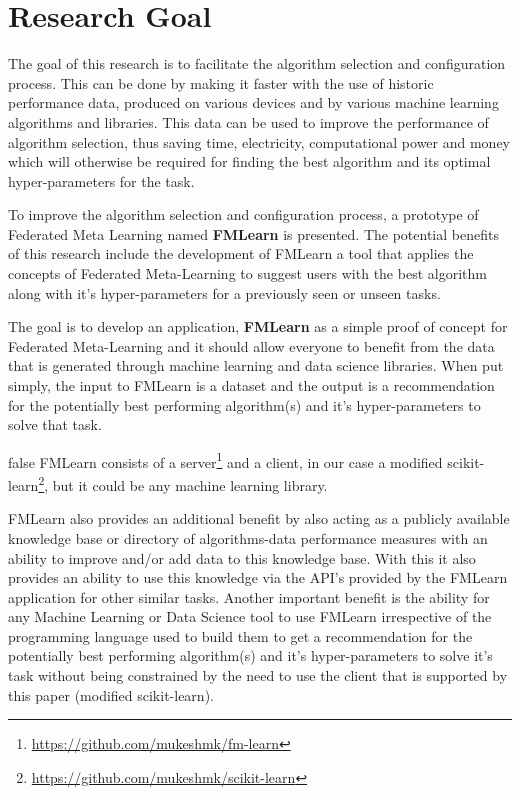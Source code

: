 \section{Research Goal}
The goal of this research is to facilitate the algorithm selection and configuration process. This can be done by making it faster with the use of historic performance data, produced on various devices and by various machine learning algorithms and libraries. This data can be used to improve the performance of algorithm selection, thus saving time, electricity, computational power and money which will otherwise be required for finding the best algorithm and its optimal hyper-parameters for the task.

To improve the algorithm selection and configuration process, a prototype of Federated Meta Learning named \textbf{FMLearn} is presented. The potential benefits of this research include the development of FMLearn a tool that applies the concepts of Federated Meta-Learning to suggest users with the best algorithm along with it's hyper-parameters for a previously seen or unseen tasks.

The goal is to develop an application, \textbf{FMLearn} as a simple proof of concept for Federated Meta-Learning and it should allow everyone to benefit from the data that is generated through machine learning and data science libraries. When put simply, the input to FMLearn is a dataset and the output is a recommendation for the potentially best performing algorithm(s) and it's hyper-parameters to solve that task.

\if false
FMLearn consists of a server\footnote{\url{https://github.com/mukeshmk/fm-learn}} and a client, in our case a modified scikit-learn\footnote{\url{https://github.com/mukeshmk/scikit-learn}}, but it could be any machine learning library.
\fi

FMLearn also provides an additional benefit by also acting as a publicly available knowledge base or directory of algorithms-data performance measures with an ability to improve and/or add data to this knowledge base. With this it also provides an ability to use this knowledge via the API's provided by the FMLearn application for other similar tasks. Another important benefit is the ability for any Machine Learning or Data Science tool to use FMLearn irrespective of the programming language used to build them to get a recommendation for the potentially best performing algorithm(s) and it's hyper-parameters to solve it's task without being constrained by the need to use the client that is supported by this paper (modified scikit-learn).


